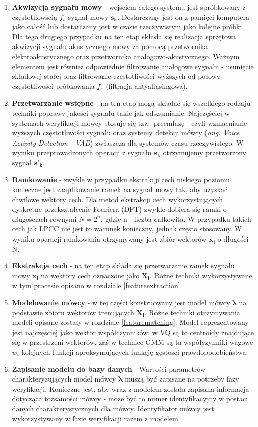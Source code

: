 \begin{enumerate}
\item{\textbf{Akwizycja sygnału mowy}} - wejściem całego systemu jest spróbkowany z częstotliowścią $f_s$ sygnał mowy $\bm{s_k}$. Dostarczany jest on z pamięci komputera jako całość lub dostarczany jest w czasie rzeczywistym jako kolejne próbki. Dla tego drugiego przypadku na ten etap składa się realizacja sprzętowa akwizycji sygnału akustycznego mowy za pomocą przetwornika elektroakustycznego oraz przetwornika analogowo-akustycznego. Ważnym elementem jest również odpowiednie filtrowanie
    analogowe sygnału - usunięcie składowej stałej oraz filtrowanie częstotliwości wyższych od połowy częstotliwości próbkowania $f_s$ (filtracja antyaliasingowa).
\item{\textbf{Przetwarzanie wstępne}} - na ten etap mogą składać się wszelkiego rodzaju techniki poprawy jakości sygnału takie jak odszumianie. Najczęściej w systemach weryfikacji mówcy stosuje się tzw. preemfazę - czyli wzmacnianie wyższych częstotliwości sygnału oraz systemy detekcji mówcy (\textit{ang. Voice Activity Detection - VAD})  zwłaszcza dla systemów czasu rzeczywistego. W wyniku przeprowadzonych operacji z sygnału $\bm{s_k}$ otrzymujemy przetworzony sygnał $\bm{s'_k}$.
\item{\textbf{Ramkowanie}} - zwykle w przypadku ekstrakcji cech niskiego poziomu konieczne jest zaaplikowanie ramek na sygnał mowy tak, aby uzyskać chwilowe wektory cech. Dla metod ekstrakcji cech wykorzystujących dyskretne przekształcenie Fouriera (DFT) zwykle dobiera się ramki o długościach równymi $N=2^n$, gdzie n - liczba całkowita. W przypadku takich cech jak LPCC nie jest to warunek konieczny, jednak często stosowany. W wyniku operacji ramkowania otrzymywany jest zbiór wektorów $\bm{x_i}$ o długości N.
\item{\textbf{Ekstrakcja cech}} - na ten etap składa się przetwarzanie ramek sygnału mowy $\bm{x_i}$ na wektory cech oznaczone jako $\bm{X_i}$. Różne techniki wykorzystywane w tym procesie opisano w rozdziale {\ref{featureextraction}}.
\item{\textbf{Modelowanie mówcy}} - w tej części konstruowany jest model mówcy $\bm{\lambda}$ na podstawie zbioru wektorów trenujących $\bm{X_i}$. Różne techniki otrzymywania modeli opisane zostały w rozdziale {\ref{featurematching}}. Model reprezentowany jest najczęściej jako wektor współczynników: w VQ są to centroidy znajdujące się w przestrzeni wektorów, zaś w technice GMM są tą współczynniki wagowe $w_i$ kolejnych funkcji aproksymujących funkcję gęstości prawdopodobieństwa.
\item{\textbf{Zapisanie modelu do bazy danych}} - Wartości parametrów charakteryzujących model mówcy $\bm{\lambda}$ muszą być zapisane na potrzeby fazy weryfikacji. Konieczne jest, aby wraz z modelem została zapisana informacja dotycząca tożsamości mówcy - może być to numer identyfikacyjny w postaci danych charakterystycznych dla mówcy. Identyfikator mówcy jest wykorzystywany w fazie weryfikacji razem z modelem.
\end{enumerate}

